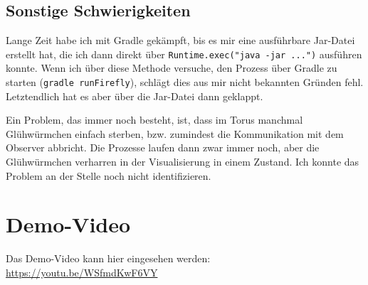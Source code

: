 \documentclass[12pt]{article}
\begin{document}
\subsection*{Sonstige Schwierigkeiten}
Lange Zeit habe ich mit Gradle gekämpft, bis es mir eine ausführbare Jar-Datei erstellt hat, die ich dann direkt über \texttt{Runtime.exec("java -jar ...")} ausführen konnte. Wenn ich über diese Methode versuche, den Prozess über Gradle zu starten (\texttt{gradle runFirefly}), schlägt dies aus mir nicht bekannten Gründen fehl. Letztendlich hat es aber über die Jar-Datei dann geklappt.

Ein Problem, das immer noch besteht, ist, dass im Torus manchmal Glühwürmchen einfach sterben, bzw. zumindest die Kommunikation mit dem Observer abbricht. Die Prozesse laufen dann zwar immer noch, aber die Glühwürmchen verharren in der Visualisierung in einem Zustand. Ich konnte das Problem an der Stelle noch nicht identifizieren.

\section*{Demo-Video}
Das Demo-Video kann hier eingesehen werden: \url{https://youtu.be/WSfmdKwF6VY}
	
\end{document}
